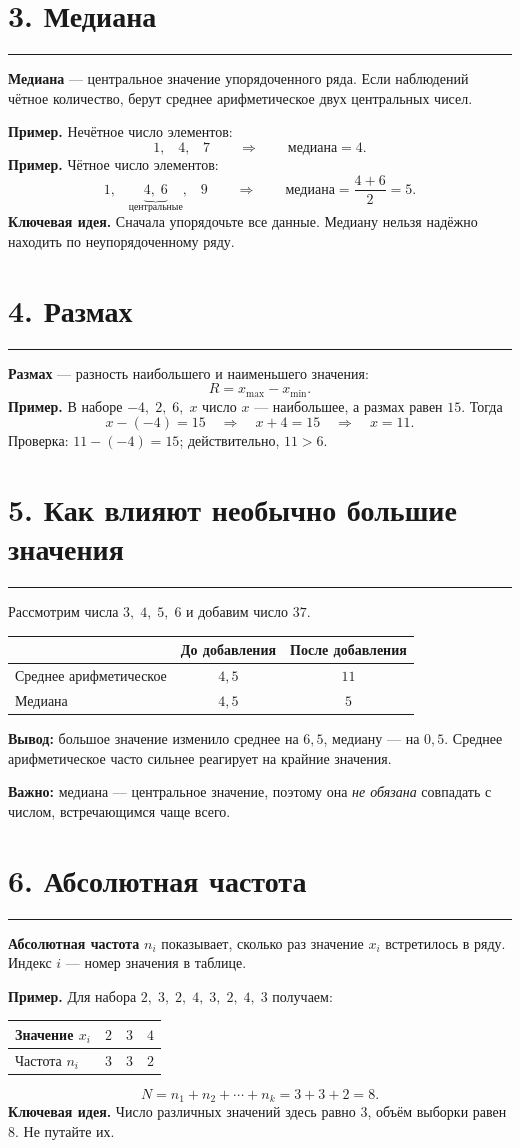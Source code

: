 \documentclass[a4paper,12pt]{article}
\newcommand{\sect}[1]{\vspace{0.8em}\section*{\color{darkaccent}\large #1}\vspace{-0.6em}\color{accent}\rule{\linewidth}{0.45pt}\color{textgray}\vspace{0.3em}}
\newcommand{\idea}[1]{{\color{darkaccent}\bfseries Ключевая идея.} #1}
\newcommand{\ex}[1]{{\color{darkaccent}\bfseries Пример.} #1}
\begin{document}
\clearpage
\sect{3. Медиана}
\textbf{Медиана} --- центральное значение упорядоченного ряда. Если наблюдений чётное количество, берут среднее арифметическое двух центральных чисел.

\ex{Нечётное число элементов:}
\[
1,\;\;\; \boxed{4},\;\;\;7
\qquad\Longrightarrow\qquad \text{медиана}=4.
\]
\ex{Чётное число элементов:}
\[
1,\;\;\;\underbrace{4,\;6}_{\text{центральные}},\;\;\;9
\qquad\Longrightarrow\qquad \text{медиана}=\frac{4+6}{2}=5.
\]
\idea{Сначала упорядочьте все данные. Медиану нельзя надёжно находить по неупорядоченному ряду.}

\sect{4. Размах}
\textbf{Размах} --- разность наибольшего и наименьшего значения:
\[
R=x_{\max}-x_{\min}.
\]
\ex{В наборе $-4,\;2,\;6,\;x$ число $x$ --- наибольшее, а размах равен $15$. Тогда}
\[
x-(-4)=15\quad\Longrightarrow\quad x+4=15\quad\Longrightarrow\quad x=11.
\]
Проверка: $11-(-4)=15$; действительно, $11>6$.

\clearpage
\sect{5. Как влияют необычно большие значения}
Рассмотрим числа $3,\;4,\;5,\;6$ и добавим число $37$.
\begin{center}
\renewcommand{\arraystretch}{1.28}
\begin{tabularx}{\linewidth}{@{}Xcc@{}}
\toprule
& До добавления & После добавления \\
\midrule
Среднее арифметическое & $4{,}5$ & $11$ \\
Медиана & $4{,}5$ & $5$ \\
\bottomrule
\end{tabularx}
\end{center}
\textbf{Вывод:} большое значение изменило среднее на $6{,}5$, медиану --- на $0{,}5$. Среднее арифметическое часто сильнее реагирует на крайние значения.

\textbf{Важно:} медиана --- центральное значение, поэтому она \emph{не обязана} совпадать с числом, встречающимся чаще всего.

\sect{6. Абсолютная частота}
\textbf{Абсолютная частота} $n_i$ показывает, сколько раз значение $x_i$ встретилось в ряду. Индекс $i$ --- номер значения в таблице.

\ex{Для набора $2,\;3,\;2,\;4,\;3,\;2,\;4,\;3$ получаем:}
\begin{center}
\renewcommand{\arraystretch}{1.25}
\begin{tabular}{@{}lccc@{}}
\toprule
Значение $x_i$ & $2$ & $3$ & $4$ \\
\midrule
Частота $n_i$ & $3$ & $3$ & $2$ \\
\bottomrule
\end{tabular}
\end{center}
\[
N=n_1+n_2+\cdots+n_k=3+3+2=8.
\]
\idea{Число различных значений здесь равно $3$, объём выборки равен $8$. Не путайте их.}
\end{document}

